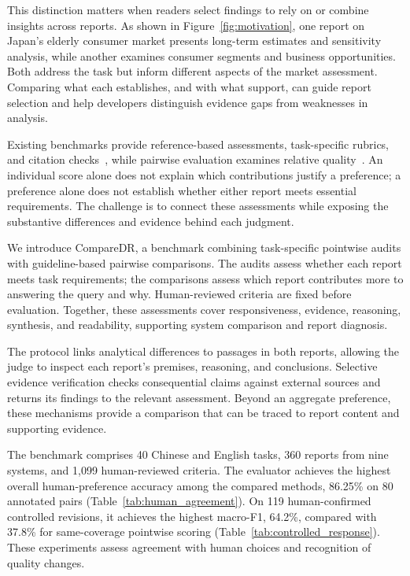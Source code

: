 \documentclass{article}
\begin{document}
This distinction matters when readers select findings to rely on or combine insights across reports. As shown in Figure~\ref{fig:motivation}, one report on Japan's elderly consumer market presents long-term estimates and sensitivity analysis, while another examines consumer segments and business opportunities. Both address the task but inform different aspects of the market assessment. Comparing what each establishes, and with what support, can guide report selection and help developers distinguish evidence gaps from weaknesses in analysis.

Existing benchmarks provide reference-based assessments, task-specific rubrics, and citation checks~\citep{drb12025,ResearchRubrics2025,drb22026}, while pairwise evaluation examines relative quality~\citep{reportlogic2026,openrs2026}. An individual score alone does not explain which contributions justify a preference; a preference alone does not establish whether either report meets essential requirements. The challenge is to connect these assessments while exposing the substantive differences and evidence behind each judgment.




We introduce CompareDR, a benchmark combining task-specific pointwise audits with guideline-based pairwise comparisons. The audits assess whether each report meets task requirements; the comparisons assess which report contributes more to answering the query and why. Human-reviewed criteria are fixed before evaluation. Together, these assessments cover responsiveness, evidence, reasoning, synthesis, and readability, supporting system comparison and report diagnosis.

The protocol links analytical differences to passages in both reports, allowing the judge to inspect each report's premises, reasoning, and conclusions. Selective evidence verification checks consequential claims against external sources and returns its findings to the relevant assessment. Beyond an aggregate preference, these mechanisms provide a comparison that can be traced to report content and supporting evidence.

The benchmark comprises 40 Chinese and English tasks, 360 reports from nine systems, and 1,099 human-reviewed criteria. The evaluator achieves the highest overall human-preference accuracy among the compared methods, 86.25\% on 80 annotated pairs (Table~\ref{tab:human_agreement}). On 119 human-confirmed controlled revisions, it achieves the highest macro-F1, 64.2\%, compared with 37.8\% for same-coverage pointwise scoring (Table~\ref{tab:controlled_response}). These experiments assess agreement with human choices and recognition of quality changes.
\end{document}
